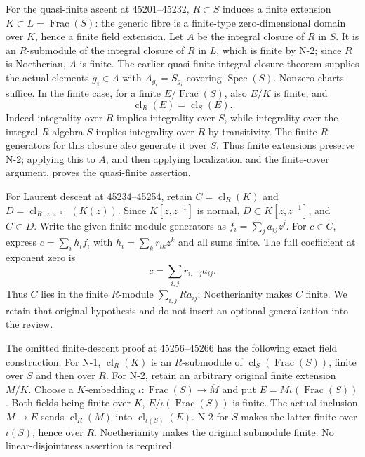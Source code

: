 For the quasi-finite ascent at 45201--45232, \(R\subset S\) induces a finite extension \(K\subset L=\operatorname{Frac}(S)\): the generic fibre is a finite-type zero-dimensional domain over \(K\), hence a finite field extension. Let \(A\) be the integral closure of \(R\) in \(S\). It is an \(R\)-submodule of the integral closure of \(R\) in \(L\), which is finite by N-2; since \(R\) is Noetherian, \(A\) is finite. The earlier quasi-finite integral-closure theorem supplies the actual elements \(g_i\in A\) with \(A_{g_i}=S_{g_i}\) covering \(\operatorname{Spec}(S)\). Nonzero charts suffice. In the finite case, for a finite \(E/\operatorname{Frac}(S)\), also \(E/K\) is finite, and \[
 \operatorname{cl}_R(E)=\operatorname{cl}_S(E).
\] Indeed integrality over \(R\) implies integrality over \(S\), while integrality over the integral \(R\)-algebra \(S\) implies integrality over \(R\) by transitivity. The finite \(R\)-generators for this closure also generate it over \(S\). Thus finite extensions preserve N-2; applying this to \(A\), and then applying localization and the finite-cover argument, proves the quasi-finite assertion.

For Laurent descent at 45234--45254, retain \(C=\operatorname{cl}_R(K)\) and \(D=\operatorname{cl}_{R[z,z^{-1}]}(K(z))\). Since \(K[z,z^{-1}]\) is normal, \(D\subset K[z,z^{-1}]\), and \(C\subset D\). Write the given finite module generators as \(f_i=\sum_j a_{ij}z^j\). For \(c\in C\), express \(c=\sum_i h_i f_i\) with \(h_i=\sum_k r_{ik}z^k\) and all sums finite. The full coefficient at exponent zero is \[
 c=\sum_{i,j}r_{i,-j}a_{ij}.
\] Thus \(C\) lies in the finite \(R\)-module \(\sum_{i,j}Ra_{ij}\); Noetherianity makes \(C\) finite. We retain that original hypothesis and do not insert an optional generalization into the review.

The omitted finite-descent proof at 45256--45266 has the following exact field construction. For N-1, \(\operatorname{cl}_R(K)\) is an \(R\)-submodule of \(\operatorname{cl}_S(\operatorname{Frac}(S))\), finite over \(S\) and then over \(R\). For N-2, retain an arbitrary original finite extension \(M/K\). Choose a \(K\)-embedding \(\iota:\operatorname{Frac}(S)\to\overline M\) and put \(E=M\iota(\operatorname{Frac}(S))\). Both fields being finite over \(K\), \(E/\iota(\operatorname{Frac}(S))\) is finite. The actual inclusion \(M\to E\) sends \(\operatorname{cl}_R(M)\) into \(\operatorname{cl}_{\iota(S)}(E)\). N-2 for \(S\) makes the latter finite over \(\iota(S)\), hence over \(R\). Noetherianity makes the original submodule finite. No linear-disjointness assertion is required.


